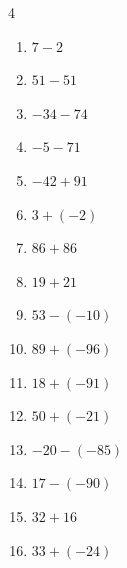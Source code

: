 \begin{multicols}{4}
\begin{enumerate}
        \phantom{$=-78$}

  \item $7-2$

        \phantom{$=5$}

  \item $51-51$

        \phantom{$=0$}

  \item $-34-74$

        \phantom{$=-108$}

  \item $-5-71$

        \phantom{$=-76$}

  \item $-42+91$

        \phantom{$=49$}

  \item $3+(-2)$

        \phantom{$=1$}

  \item $86+86$

        \phantom{$=172$}

  \item $19+21$

        \phantom{$=40$}

  \item $53-(-10)$

        \phantom{$=63$}

\columnbreak %

  \item $89+(-96)$

        \phantom{$=-7$}

  \item $18+(-91)$

        \phantom{$=-73$}

  \item $50+(-21)$

        \phantom{$=29$}

  \item $-20-(-85)$

        \phantom{$=65$}

  \item $17-(-90)$

        \phantom{$=107$}

  \item $32+16$

        \phantom{$=48$}

  \item $33+(-24)$


\end{enumerate}
\end{multicols}
